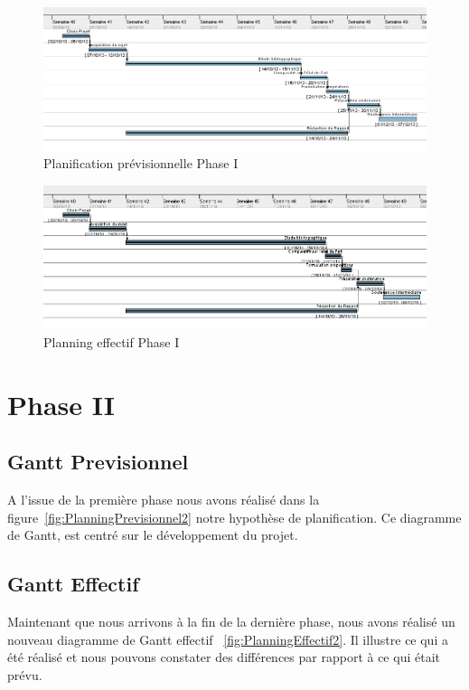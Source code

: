 \documentclass[11pt, french]{report-rd-info}
\begin{document}
\begin{figure}
	\centering
		\includegraphics[width=1\textwidth]{Gantts/p1_previsionnel}
	\caption{Planification prévisionnelle Phase I}
	\label{fig:PlanningPrevisionnel}
\end{figure}
\begin{figure}
	\centering
		\includegraphics[width=1\textwidth]{Gantts/p1_effectif}
	\caption{Planning effectif Phase I}
	\label{fig:PlanningEffectif}
\end{figure}



\section{Phase II}
\subsection{Gantt Previsionnel}
A l'issue de la première phase nous avons réalisé dans la figure~\ref{fig:PlanningPrevisionnel2} notre hypothèse de planification. Ce diagramme de Gantt, est centré sur le développement du projet.

\subsection{Gantt Effectif}
Maintenant que nous arrivons à la fin de la dernière phase, nous avons réalisé un nouveau diagramme de Gantt effectif ~\ref{fig:PlanningEffectif2}. Il illustre ce qui a été réalisé et nous pouvons constater des différences par rapport à ce qui était prévu.
\end{document}
